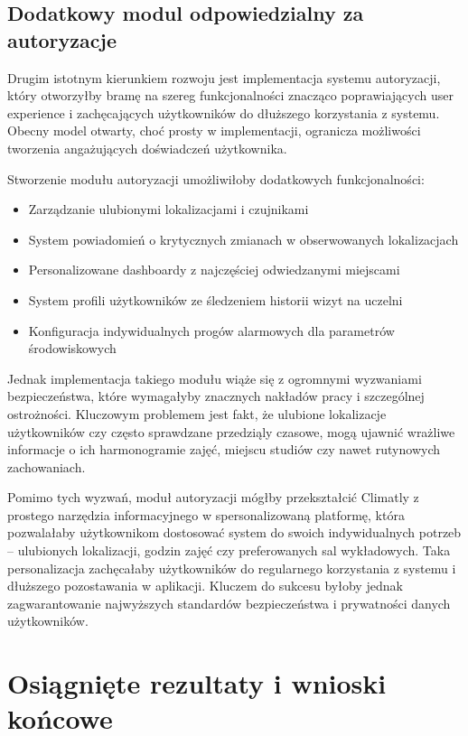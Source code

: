 \documentclass[a4paper,12pt,openany]{book}
\begin{document}
\subsection*{Dodatkowy modul odpowiedzialny za autoryzacje}

Drugim istotnym kierunkiem rozwoju jest implementacja systemu autoryzacji, który otworzyłby bramę na szereg funkcjonalności znacząco poprawiających user experience i zachęcających użytkowników do dłuższego korzystania z systemu. Obecny model otwarty, choć prosty w implementacji, ogranicza możliwości tworzenia angażujących doświadczeń użytkownika.

Stworzenie modułu autoryzacji umożliwiłoby dodatkowych funkcjonalności:
\begin{itemize}
   \item Zarządzanie ulubionymi lokalizacjami i czujnikami
   \item System powiadomień o krytycznych zmianach w obserwowanych lokalizacjach
   \item Personalizowane dashboardy z najczęściej odwiedzanymi miejscami
   \item System profili użytkowników ze śledzeniem historii wizyt na uczelni
   \item Konfiguracja indywidualnych progów alarmowych dla parametrów środowiskowych
\end{itemize}

Jednak implementacja takiego modułu wiąże się z ogromnymi wyzwaniami bezpieczeństwa, które wymagałyby znacznych nakładów pracy i szczególnej ostrożności. Kluczowym problemem jest fakt, że ulubione lokalizacje użytkowników czy często sprawdzane przedziąly czasowe, mogą ujawnić wrażliwe informacje o ich harmonogramie zajęć, miejscu studiów czy nawet rutynowych zachowaniach.

Pomimo tych wyzwań, moduł autoryzacji mógłby przekształcić Climatly z prostego narzędzia informacyjnego w spersonalizowaną platformę, która pozwalałaby użytkownikom dostosować system do swoich indywidualnych potrzeb -- ulubionych lokalizacji, godzin zajęć czy preferowanych sal wykładowych. Taka personalizacja zachęcałaby użytkowników do regularnego korzystania z systemu i dłuższego pozostawania w aplikacji. Kluczem do sukcesu byłoby jednak zagwarantowanie najwyższych standardów bezpieczeństwa i prywatności danych użytkowników.

\section{Osiągnięte rezultaty i wnioski końcowe}
\end{document}
